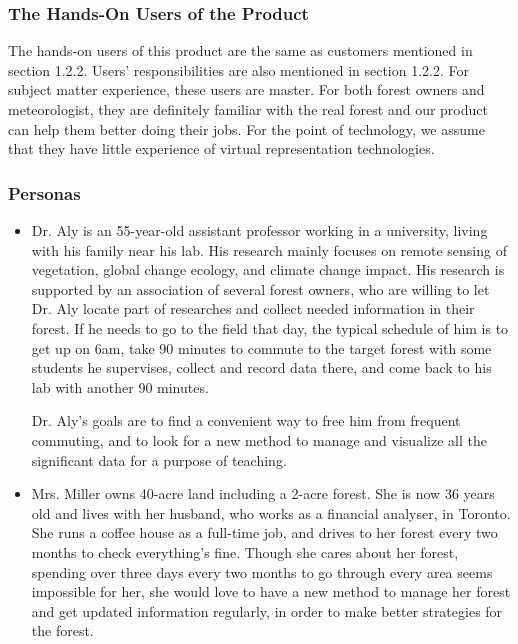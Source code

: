\documentclass{article}
\begin{document}
\subsubsection{The Hands-On Users of the Product}
The hands-on users of this product are the same as customers mentioned in section 1.2.2. Users'
responsibilities are also mentioned in section 1.2.2. For subject matter experience, these 
users are master. For both forest owners and meteorologist, they are definitely
familiar with the real forest and our product can help them better doing
their jobs. For the point of technology, we assume that they 
have little experience of virtual representation
technologies.
\subsubsection{Personas}

\begin{itemize}
    \item Dr. Aly is an 55-year-old assistant professor working in a university, living with his family near his lab. His research mainly focuses on remote sensing of vegetation, global change ecology, and climate change impact. His research is supported by an association of several forest owners, who are willing to let Dr. Aly locate part of researches and collect needed information in their forest. If he needs to go to the field that day, the typical schedule of him is to get up on 6am, take 90 minutes to commute to the target forest with some students he supervises, collect and record data there, and come back to his lab with another 90 minutes. 
    
    Dr. Aly's goals are to find a convenient way to free him from frequent commuting, and to look for a new method to manage and visualize all the significant data for a purpose of teaching. 
    
    \item Mrs. Miller owns 40-acre land including a 2-acre forest. She is now 36 years old and lives with her husband, who works as a financial analyser, in Toronto. She runs a coffee house as a full-time job, and drives to her forest every two months to check everything's fine. Though she cares about her forest, spending over three days every two months to go through every area seems impossible for her, she would love to have a new method to manage her forest and get updated information regularly, in order to make better strategies for the forest. 
\end{itemize}
\end{document}
